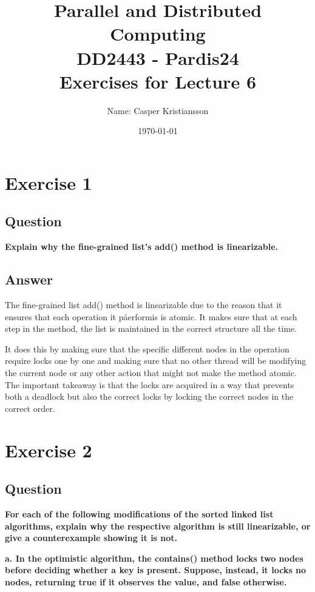 \documentclass{article}
\title{\textbf{Parallel and Distributed Computing\\DD2443 - Pardis24\\Exercises for Lecture 6}}
\author{Name: Casper Kristiansson}
\date{\today}
\begin{document}
\setlength\parindent{0pt}
\setlength{\parskip}{\bigskipamount}

\maketitle

\section*{Exercise 1}
\subsection*{Question}
\textbf{Explain why the fine-grained list’s add() method is linearizable.}

\subsection*{Answer}
The fine-grained list add() method is linearizable due to the reason that it ensures that each operation it påerformis is atomic. It makes sure that at each step in the method, the list is maintained in the correct structure all the time.

It does this by making sure that the specific different nodes in the operation require locks one by one and making sure that no other thread will be modifying the current node or any other action that might not make the method atomic. The important takeaway is that the locks are acquired in a way that prevents both a deadlock but also the correct locks by locking the correct nodes in the correct order.





\section*{Exercise 2}
\subsection*{Question}
\textbf{For each of the following modifications of the sorted linked list algorithms, explain why the respective algorithm is still linearizable, or give a counterexample showing it is not.}

\textbf{a. In the optimistic algorithm, the contains() method locks two nodes before deciding whether a key is present. Suppose, instead, it locks no nodes, returning true if it observes the value, and false otherwise.}
\end{document}
